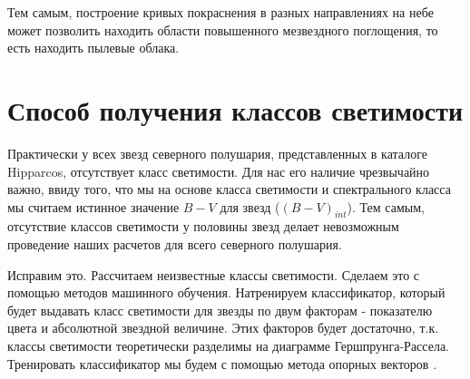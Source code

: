 \documentclass[14pt]{article}
\begin{document}
        		Тем самым, построение кривых покраснения в разных направлениях на небе может позволить находить области повышенного мезвездного поглощения, то есть находить пылевые облака. 
			        
        
        
        
        
        
	\section{Способ получения классов светимости}
	
	    Практически у всех звезд северного полушария, представленных в каталоге Hipparcos, отсутствует класс светимости. Для нас его наличие чрезвычайно важно, ввиду того, что мы на основе класса светимости и спектрального класса мы считаем истинное значение $B - V$ для звезд ($(B - V)_{int}$). Тем самым, отсутствие классов светимости у половины звезд делает невозможным проведение наших расчетов для всего северного полушария.
		
		Исправим это. Рассчитаем неизвестные классы светимости. Сделаем это с помощью методов машинного обучения. Натренируем классификатор, который будет выдавать класс светимости для звезды по двум факторам - показателю цвета и абсолютной звездной величине. Этих факторов будет достаточно, т.к. классы светимости теоретически разделимы на диаграмме Гершпрунга-Рассела. Тренировать классификатор мы будем с помощью метода опорных векторов \cite{svm}.
		
\end{document}
